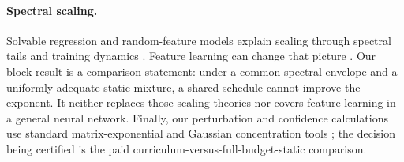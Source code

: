 \paragraph{Spectral scaling.}
Solvable regression and random-feature models explain scaling through spectral tails and training dynamics \citep{maloney2022,bordelon2022,bordelon2024}. Feature learning can change that picture \citep{bordelon2025}. Our block result is a comparison statement: under a common spectral envelope and a uniformly adequate static mixture, a shared schedule cannot improve the exponent. It neither replaces those scaling theories nor covers feature learning in a general neural network. Finally, our perturbation and confidence calculations use standard matrix-exponential and Gaussian concentration tools \citep{higham2008,boucheron2013}; the decision being certified is the paid curriculum-versus-full-budget-static comparison.

